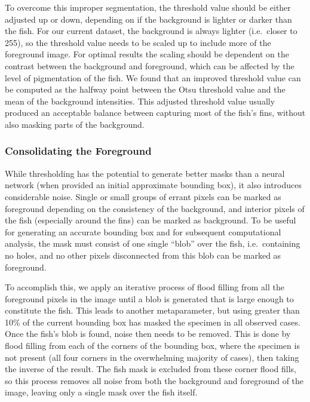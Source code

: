 \documentclass[conference]{IEEEtran}
\begin{document}
To overcome this improper segmentation, the threshold value should be
either adjusted up or down, depending on if the background is lighter or darker than the fish.
For our current dataset, the background is always lighter (i.e.~closer to 255), so the threshold value needs to be scaled up to include more of the
foreground image.
For optimal results the scaling should be dependent on the
contrast between the background and foreground,
which can be affected by
the level of pigmentation of the fish.
We found that an improved threshold value can be computed as the halfway
point between the Otsu threshold value and the
mean of the background intensities.
This adjusted threshold value
usually produced an acceptable balance between capturing most of the
fish's fins, without also masking parts of the background.

\subsubsection{Consolidating the Foreground}
While thresholding has the potential to generate better masks than a neural network (when provided an initial approximate bounding box), it also introduces considerable noise. Single or small groups of errant pixels can be marked as foreground depending on the consistency of the background, and interior pixels of the fish (especially around the fins) can be marked as background. To be useful for generating an accurate bounding box and for subsequent computational analysis, the mask must consist of one single ``blob'' over the fish, i.e.~containing no holes, and no other pixels disconnected from this blob can be marked as foreground.

To accomplish this, we apply an iterative process of flood filling from all the foreground pixels in the image until a blob is generated that is large enough to constitute the fish. This leads to another metaparameter, but
using greater than 10\% of the current bounding box has masked the specimen in all observed cases. Once the fish's blob is found, noise then needs 
to be removed. This is done by flood filling from each of the corners of the bounding box, where the specimen is not present (all four corners in the overwhelming majority of cases), then taking the inverse of the result. The fish mask is excluded from these corner flood fills, so this process removes all noise from both the background and foreground of the image, leaving only a single
mask over the fish itself.
\end{document}
